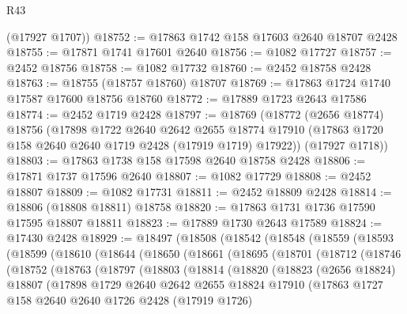 \begin{lexlean}{R43}
\begin{coremodule}
      (@17927 @1707))
@18752 := @17863 @1742 @158 @17603 @2640 @18707 @2428
@18755 := @17871 @1741 @17601 @2640
@18756 := @1082 @17727
@18757 := @2452 @18756
@18758 := @1082 @17732
@18760 := @2452 @18758 @2428
@18763 := @18755 (@18757 @18760) @18707
@18769 := @17863 @1724 @1740 @17587 @17600 @18756 @18760
@18772 := @17889 @1723 @2643 @17586
@18774 := @2452 @1719 @2428
@18797 := @18769
    (@18772
      (@2656 @18774)
      @18756
      (@17898
        @1722
        @2640
        @2642
        @2655
        @18774
        @17910
        (@17863 @1720 @158 @2640 @2640 @1719 @2428 (@17919 @1719) @17922))
      (@17927 @1718))
@18803 := @17863 @1738 @158 @17598 @2640 @18758 @2428
@18806 := @17871 @1737 @17596 @2640
@18807 := @1082 @17729
@18808 := @2452 @18807
@18809 := @1082 @17731
@18811 := @2452 @18809 @2428
@18814 := @18806 (@18808 @18811) @18758
@18820 := @17863 @1731 @1736 @17590 @17595 @18807 @18811
@18823 := @17889 @1730 @2643 @17589
@18824 := @17430 @2428
@18929 := @18497
    (@18508
      (@18542
        (@18548
          (@18559
            (@18593
              (@18599
                (@18610
                  (@18644
                    (@18650
                      (@18661
                        (@18695
                          (@18701
                            (@18712
                              (@18746
                                (@18752
                                  (@18763
                                    (@18797
                                      (@18803
                                        (@18814
                                          (@18820
                                            (@18823
                                              (@2656 @18824)
                                              @18807
                                              (@17898
                                                @1729
                                                @2640
                                                @2642
                                                @2655
                                                @18824
                                                @17910
                                                (@17863
                                                  @1727
                                                  @158
                                                  @2640
                                                  @2640
                                                  @1726
                                                  @2428
                                                  (@17919 @1726)

\end{coremodule}
\end{lexlean}
